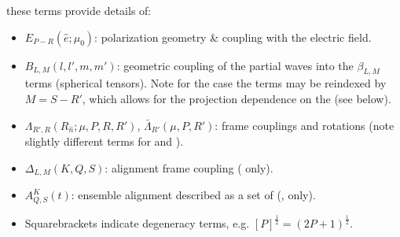\documentclass[letterpaper,table,10pt,english]{jupyterBook}
\begin{document}
\sphinxAtStartPar
these terms provide details of:
\begin{itemize}
\item {} 
\sphinxAtStartPar
\({E_{P-R}(\hat{e};\mu_{0})}\): polarization geometry \& coupling with
the electric field.

\item {} 
\sphinxAtStartPar
\(B_{L,M}(l,l',m,m')\): geometric coupling of the partial waves into the \(\beta_{L,M}\) terms (spherical tensors). Note for the {\hyperref[\detokenize{backmatter/glossary:term-AF}]{}} case the terms may be reindexed by \(M=S-R'\), which allows for the projection dependence on the {\hyperref[\detokenize{backmatter/glossary:term-ADMs}]{}} (see below).

\item {} 
\sphinxAtStartPar
\(\Lambda_{R',R}(R_{\hat{n}};\mu,P,R,R')\), \(\bar{\Lambda}_{R'}(\mu,P,R')\): frame couplings and rotations (note slightly different terms for {\hyperref[\detokenize{backmatter/glossary:term-MF}]{}} and {\hyperref[\detokenize{backmatter/glossary:term-AF}]{}}).

\item {} 
\sphinxAtStartPar
\(\Delta_{L,M}(K,Q,S)\): alignment frame coupling ({\hyperref[\detokenize{backmatter/glossary:term-AF}]{}} only).

\item {} 
\sphinxAtStartPar
\(A_{Q,S}^{K}(t)\): ensemble alignment described as a set of {\hyperref[\detokenize{backmatter/glossary:term-Axis-distribution-moments}]{}} ({\hyperref[\detokenize{backmatter/glossary:term-ADMs}]{}}, {\hyperref[\detokenize{backmatter/glossary:term-AF}]{}} only).

\item {} 
\sphinxAtStartPar
Square\sphinxhyphen{}brackets indicate degeneracy terms, e.g. \([P]^{\frac{1}{2}} = (2P+1)^{\frac{1}{2}}\).

\end{itemize}
\end{document}
